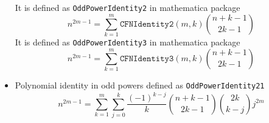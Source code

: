 \begin{itemize}
\begin{equation*}
    \end{equation*}
    It is defined as \texttt{OddPowerIdentity2} in mathematica package
    \begin{equation*}
        n^{2m-1} = \sum_{k=1}^{m} \mathtt{CFNIdentity2} (m,k) \binom{n+k-1}{2k-1}
    \end{equation*}
    It is defined as \texttt{OddPowerIdentity3} in mathematica package
    \begin{equation*}
        n^{2m-1} = \sum_{k=1}^{m} \mathtt{CFNIdentity3} (m,k) \binom{n+k-1}{2k-1}
    \end{equation*}
    \item Polynomial identity in odd powers defined as \texttt{OddPowerIdentity21}
    \begin{equation*}
        n^{2m-1} = \sum_{k=1}^{m} \sum_{j=0}^{k} \frac{(-1)^{k-j}}{k} \binom{n+k-1}{2k-1} \binom{2k}{k-j} j^{2m}
    \end{equation*}
\end{itemize}